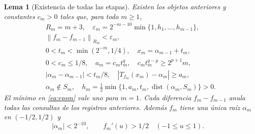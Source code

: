 \documentclass[11pt,a4paper]{article}
\numberwithin{equation}{section}
\newtheorem{lemma}[theorem]{Lema}
\theoremstyle{definition}
\theoremstyle{remark}
\newcommand{\norm}[1]{\left\lVert#1\right\rVert}
\DeclareMathOperator{\dist}{dist}
\begin{document}
\begin{lemma}[Existencia de todas las etapas]\label{lem:construction}
Existen los objetos anteriores y constantes $c_m>0$ tales que, para todo $m\ge1$,
\begin{align}
&R_m=m+3,\quad
\varepsilon_m=2^{-m-10}\min\{1,h_1,\ldots,h_{m-1}\},\label{eq:epsm}\\
&\norm{f_m-f_{m-1}}_{R_m}<\varepsilon_m,\label{eq:increments}\\
&0<t_m<\min(2^{-m},1/4),\quad x_m=\alpha_{m-1}+t_m,\label{eq:tm}\\
&0<c_m\le1/8,\quad a_m=c_mt_m^q,\quad
c_mt_m^{q-p}\ge 2^{p+1}m,\label{eq:am}\\
&|\alpha_m-\alpha_{m-1}|<t_m/8,\quad
|T_{f_m}(x_m)-\alpha_m|\ge a_m,\label{eq:rooterror}\\
&\alpha_m\notin S_m,\quad
h_m=\tfrac12\min\{1,a_m,t_m,\dist(\alpha_m,S_m)\}>0.\label{eq:hm}
\end{align}
El mínimo en \eqref{eq:epsm} vale uno para $m=1$. Cada diferencia $f_m-f_{m-1}$ anula todas las consultas de los registros anteriores. Además $f_m$ tiene una única raíz $\alpha_m$ en $(-1/2,1/2)$ y
\begin{equation}\label{eq:rootlocalization}
|\alpha_m|<2^{-10},\qquad f_m'(u)>1/2\quad(-1\le u\le1).
\end{equation}
\end{lemma}
\end{document}
